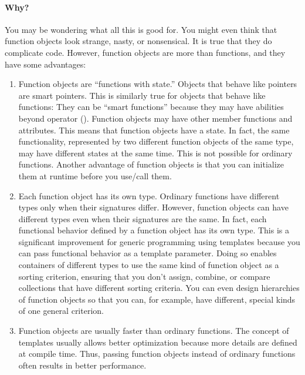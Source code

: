 \documentclass{report}
\begin{document}
   \paragraph{Why?}
   \bigbreak \noindent \bigbreak \noindent 
   You may be wondering what all this is good for. You might even think that function objects look
   strange, nasty, or nonsensical. It is true that they do complicate code. However, function objects are
   more than functions, and they have some advantages:
   \begin{enumerate}
       \item Function objects are “functions with state.” Objects that behave like pointers are smart pointers. This is similarly true for objects that behave like functions: They can be “smart functions” because they may have abilities beyond operator (). Function objects may have other member functions and attributes. This means that function objects have a state. In fact, the same functionality, represented by two different function objects of the same type, may have different states at the same time. This is not possible for ordinary functions. Another advantage of function objects is that you can initialize them at runtime before you use/call them.
       \item Each function object has its own type. Ordinary functions have different types only when their signatures differ. However, function objects can have different types even when their signatures are the same. In fact, each functional behavior defined by a function object has its own type. This is a significant improvement for generic programming using templates because you can pass functional behavior as a template parameter. Doing so enables containers of different types to use the same kind of function object as a sorting criterion, ensuring that you don’t assign, combine, or compare collections that have different sorting criteria. You can even design hierarchies of function objects so that you can, for example, have different, special kinds of one general criterion.
       \item Function objects are usually faster than ordinary functions. The concept of templates usually allows better optimization because more details are defined at compile time. Thus, passing function objects instead of ordinary functions often results in better performance.
   \end{enumerate}

   \bigbreak \noindent 
\end{document}

